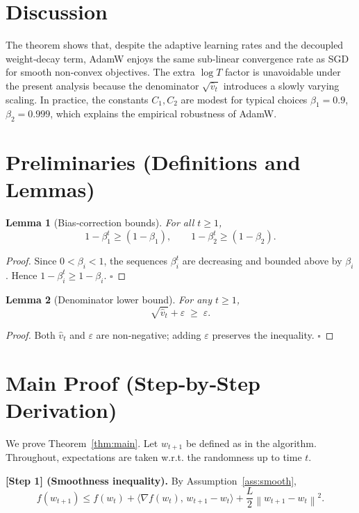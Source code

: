 \documentclass{article}
\newtheorem{lemma}{Lemma}
\newcommand{\norm}[1]{\left\lVert#1\right\rVert}
\begin{document}
\section*{Discussion}
The theorem shows that, despite the adaptive learning rates and the decoupled weight‑decay term, AdamW enjoys the same sub‑linear convergence rate as SGD for smooth non‑convex objectives. The extra $\log T$ factor is unavoidable under the present analysis because the denominator $\sqrt{\hat v_{t}}$ introduces a slowly varying scaling. In practice, the constants $C_{1},C_{2}$ are modest for typical choices $\beta_{1}=0.9$, $\beta_{2}=0.999$, which explains the empirical robustness of AdamW.

\newpage
\section*{Preliminaries (Definitions and Lemmas)}
\begin{lemma}[Bias‑correction bounds]\label{lem:bias}
For all $t\ge1$,
\[
1-\beta_{1}^{t}\ge (1-\beta_{1}),\qquad
1-\beta_{2}^{t}\ge (1-\beta_{2}).
\]
\end{lemma}
\begin{proof}
Since $0<\beta_{i}<1$, the sequences $\beta_{i}^{t}$ are decreasing and bounded above by $\beta_{i}$. Hence $1-\beta_{i}^{t}\ge 1-\beta_{i}$. \hfill $\square$
\end{proof}

\begin{lemma}[Denominator lower bound]\label{lem:denom}
For any $t\ge1$,
\[
\sqrt{\hat v_{t}}+\varepsilon\;\ge\;\varepsilon .
\]
\end{lemma}
\begin{proof}
Both $\hat v_{t}$ and $\varepsilon$ are non‑negative; adding $\varepsilon$ preserves the inequality. \hfill $\square$
\end{proof}

\section*{Main Proof (Step‑by‑Step Derivation)}
We prove Theorem~\ref{thm:main}. Let $w_{t+1}$ be defined as in the algorithm. Throughout, expectations are taken w.r.t. the randomness up to time $t$.

\bigskip
\noindent\textbf{[Step 1] (Smoothness inequality).}
By Assumption~\ref{ass:smooth},
\[
f(w_{t+1})\le f(w_{t})+\langle \nabla f(w_{t}),\,w_{t+1}-w_{t}\rangle
               +\frac{L}{2}\norm{w_{t+1}-w_{t}}^{2}.
\tag{1}
\]
\end{document}
